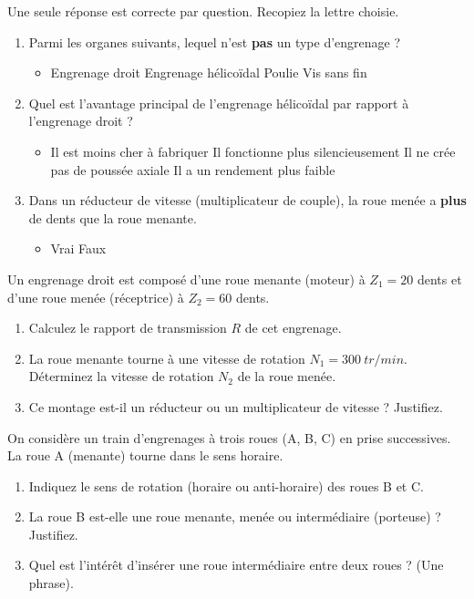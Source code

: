 \documentclass[11pt]{article}
\begin{document}
\begin{exercice}
Une seule réponse est correcte par question. Recopiez la lettre choisie.
\begin{enumerate}
    \item Parmi les organes suivants, lequel n'est \textbf{pas} un type d'engrenage ?
          \begin{itemize}
              \item[A.] Engrenage droit \quad [B.] Engrenage hélicoïdal \quad [C.] Poulie \quad [D.] Vis sans fin
          \end{itemize}
    \item Quel est l'avantage principal de l'engrenage hélicoïdal par rapport à l'engrenage droit ?
          \begin{itemize}
              \item[A.] Il est moins cher à fabriquer \quad [B.] Il fonctionne plus silencieusement \quad [C.] Il ne crée pas de poussée axiale \quad [D.] Il a un rendement plus faible
          \end{itemize}
    \item Dans un réducteur de vitesse (multiplicateur de couple), la roue menée a \textbf{plus} de dents que la roue menante.
          \begin{itemize}
              \item[A.] Vrai \quad [B.] Faux
          \end{itemize}
\end{enumerate}
\end{exercice}

\begin{exercice}
Un engrenage droit est composé d'une roue menante (moteur) à $Z_1 = 20$ dents et d'une roue menée (réceptrice) à $Z_2 = 60$ dents.
\begin{enumerate}
    \item Calculez le rapport de transmission $R$ de cet engrenage.
    \item La roue menante tourne à une vitesse de rotation $N_1 = \SI{300}{tr/min}$. Déterminez la vitesse de rotation $N_2$ de la roue menée.
    \item Ce montage est-il un réducteur ou un multiplicateur de vitesse ? Justifiez.
\end{enumerate}
\end{exercice}

\begin{exercice}
On considère un train d'engrenages à trois roues (A, B, C) en prise successives. La roue A (menante) tourne dans le sens horaire.
\begin{enumerate}
    \item Indiquez le sens de rotation (horaire ou anti-horaire) des roues B et C.
    \item La roue B est-elle une roue menante, menée ou intermédiaire (porteuse) ? Justifiez.
    \item Quel est l'intérêt d'insérer une roue intermédiaire entre deux roues ? (Une phrase).
\end{enumerate}
\end{exercice}
\end{document}
